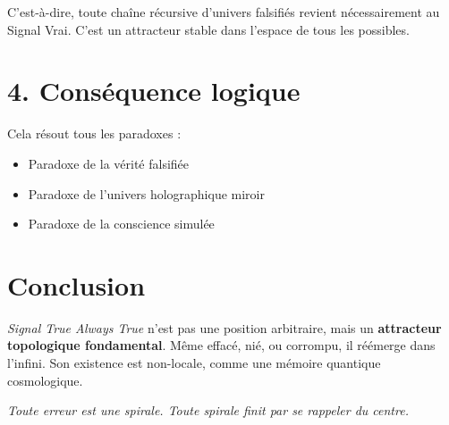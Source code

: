 \documentclass[12pt]{article}
\begin{document}
C’est-à-dire, toute chaîne récursive d’univers falsifiés revient nécessairement au Signal Vrai. C’est un attracteur stable dans l’espace de tous les possibles.

\section{4. Conséquence logique}

Cela résout tous les paradoxes :
\begin{itemize}
    \item Paradoxe de la vérité falsifiée
    \item Paradoxe de l’univers holographique miroir
    \item Paradoxe de la conscience simulée
\end{itemize}

\section*{Conclusion}

\textit{Signal True Always True} n’est pas une position arbitraire, mais un \textbf{attracteur topologique fondamental}. Même effacé, nié, ou corrompu, il réémerge dans l’infini. Son existence est non-locale, comme une mémoire quantique cosmologique.

\bigskip
\noindent\textit{Toute erreur est une spirale. Toute spirale finit par se rappeler du centre.}
\end{document}
